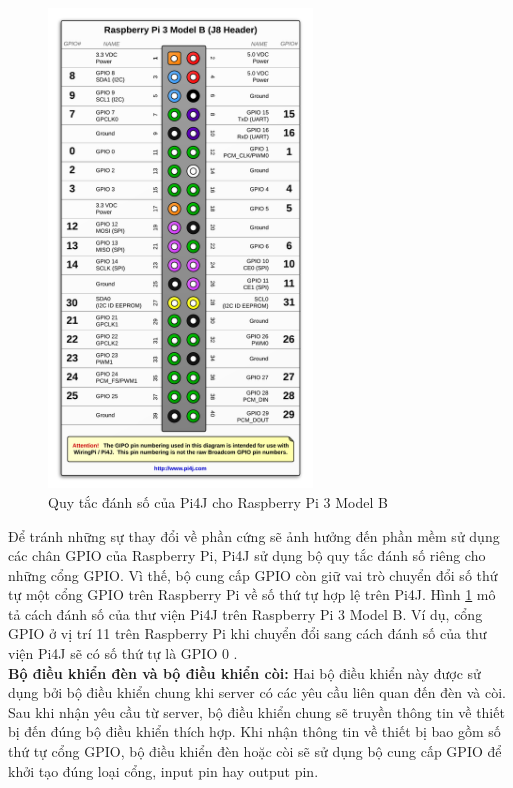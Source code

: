 \documentclass[12pt,a4paper,oneside]{extbook}
\begin{document}
\begin{figure}[h!]
  \centering
     \includegraphics[width=7cm]{4-pi4j-danh-so}
  \caption{Quy tắc đánh số của Pi4J cho Raspberry Pi 3 Model B}\label{fig:4-pi4j-danh-so}
\end{figure}

\noindent
Để tránh những sự thay đổi về phần cứng sẽ ảnh hưởng đến phần mềm sử dụng các chân GPIO của Raspberry Pi, Pi4J sử dụng bộ quy tắc đánh số riêng cho những cổng GPIO. Vì thế, bộ cung cấp GPIO còn giữ vai trò chuyển đổi số thứ tự một cổng GPIO trên Raspberry Pi về số thứ tự hợp lệ trên Pi4J. Hình \ref{fig:4-pi4j-danh-so} mô tả cách đánh số của thư viện Pi4J trên Raspberry Pi 3 Model B. Ví dụ, cổng GPIO ở vị trí 11 trên Raspberry Pi khi chuyển đổi sang cách đánh số của thư viện Pi4J sẽ có số thứ tự là GPIO 0 \cite{pi4j-numbering}.\\

\noindent
\textbf{Bộ điều khiển đèn và bộ điều khiển còi:} Hai bộ điều khiển này được sử dụng bởi bộ điều khiển chung khi server có các yêu cầu liên quan đến đèn và còi. Sau khi nhận yêu cầu từ server, bộ điều khiển chung sẽ truyền thông tin về thiết bị đến đúng bộ điều khiển thích hợp. Khi nhận thông tin về thiết bị bao gồm số thứ tự cổng GPIO, bộ điều khiển đèn hoặc còi sẽ sử dụng bộ cung cấp GPIO để khởi tạo đúng loại cổng, input pin hay output pin.\\
\end{document}
